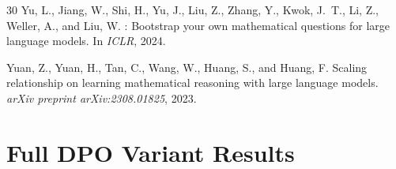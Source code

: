 \documentclass{article}
\begin{document}
\begin{thebibliography}{30}
Yu, L., Jiang, W., Shi, H., Yu, J., Liu, Z., Zhang, Y., Kwok, J.~T., Li, Z., Weller, A., and Liu, W.
: Bootstrap your own mathematical questions for large language models.
\newblock In \emph{ICLR}, 2024.

Yuan, Z., Yuan, H., Tan, C., Wang, W., Huang, S., and Huang, F.
\newblock Scaling relationship on learning mathematical reasoning with large language models.
\newblock \emph{arXiv preprint arXiv:2308.01825}, 2023.

\end{thebibliography}

\appendix

\section{Full DPO Variant Results}
\label{app:dpo_full}
\end{document}

